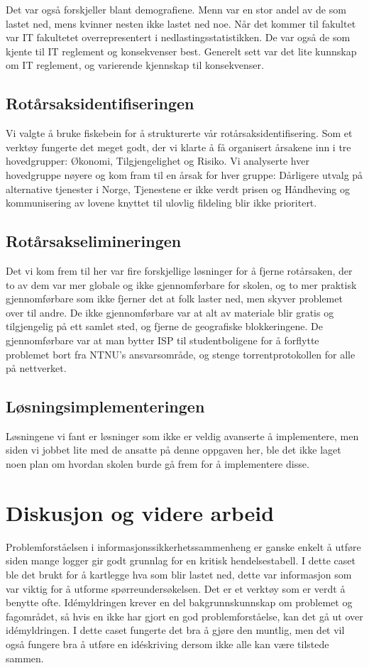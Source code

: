Det var også forskjeller blant demografiene. Menn var en stor andel av de som lastet ned, mens kvinner nesten ikke lastet ned noe. Når det kommer til fakultet var IT fakultetet overrepresentert i nedlastingsstatistikken. De var også de som kjente til IT reglement og konsekvenser best. Generelt sett var det lite kunnskap om IT reglement, og varierende kjennskap til konsekvenser. 

\subsection{Rotårsaksidentifiseringen}
Vi valgte å bruke fiskebein for å strukturerte vår rotårsaksidentifisering. Som et verktøy fungerte det meget godt, der vi klarte å få organisert årsakene inn i tre hovedgrupper: Økonomi, Tilgjengelighet og Risiko. Vi analyserte hver hovedgruppe nøyere og kom fram til en årsak for hver gruppe: Dårligere utvalg på alternative tjenester i Norge, Tjenestene er ikke verdt prisen og Håndheving og kommunisering av lovene knyttet til ulovlig fildeling blir ikke prioritert. 

\subsection{Rotårsakselimineringen}
Det vi kom frem til her var fire forskjellige løsninger for å fjerne rotårsaken, der to av dem var mer globale og ikke gjennomførbare for skolen, og to mer praktisk gjennomførbare som ikke fjerner det at folk laster ned, men skyver problemet over til andre. De ikke gjennomførbare var at alt av materiale blir gratis og tilgjengelig på ett samlet sted, og fjerne de geografiske blokkeringene. De gjennomførbare var at man bytter ISP til studentboligene for å forflytte problemet bort fra NTNU's ansvarsområde, og stenge torrentprotokollen for alle på nettverket. 

\subsection{Løsningsimplementeringen}
Løsningene vi fant er løsninger som ikke er veldig avanserte å implementere, men siden vi jobbet lite med de ansatte på denne oppgaven her, ble det ikke laget noen plan om hvordan skolen burde gå frem for å implementere disse.

\section{Diskusjon og videre arbeid}
Problemforståelsen i informasjonssikkerhetssammenheng er ganske enkelt å utføre siden mange logger gir godt grunnlag for en kritisk hendelsestabell. I dette caset ble det brukt for å kartlegge hva som blir lastet ned, dette var informasjon som var viktig for å utforme spørreundersøkelsen. Det er et verktøy som er verdt å benytte ofte. Idémyldringen krever en del bakgrunnskunnskap om problemet og fagområdet, så hvis en ikke har gjort en god problemforståelse, kan det gå ut over idémyldringen. I dette caset fungerte det bra å gjøre den muntlig, men det vil også fungere bra å utføre en idéskriving dersom ikke alle kan være tilstede sammen. 

